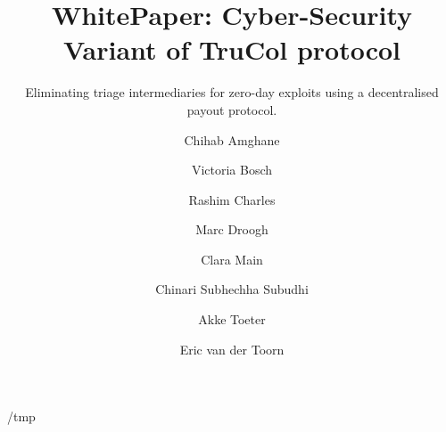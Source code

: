 \documentclass[a4paper, UKenglish, cleveref, autoref, thm-restate]{lipics-v2021}
\title{WhitePaper: Cyber-Security Variant of TruCol protocol} %
\subtitle{Eliminating triage intermediaries for zero-day exploits using a decentralised payout protocol.}
\author{Chihab Amghane}{Radboud University}%
{}{}{(Optional) author-specific funding acknowledgements}%
\author{Victoria Bosch}{Radboud University}%
{}{}{}%
\author{Rashim Charles}{Radboud University}%
{}{}{}%
\author{Marc Droogh}{Delft University of Technology}%
{}{}{}%
\author{Clara Main}{Radboud University}%
{}{}{}%
\author{Chinari Subhechha Subudhi}{Delft University of Technology}%
{}{}{}%
\author{Akke Toeter}{Delft University of Technology, Radboud University}%
{a.h.h.toeter@student.tudelft.nl}{0000-0002-9577-920X}{}%
\author{Eric van der Toorn}{Delft University of Technology}%
{}{}{}%
\def\overleafhome{/tmp}%
\begin{document}
\maketitle

\ifx\homepath\overleafhome
    
    
    
    
    
\else
    
    
    
    
    
\fi
%
 


 
\end{document}
